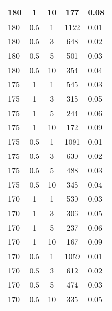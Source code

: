 \begin{longtable} {| p{3cm} | c | c | c | p{2cm} |}
	180 & 1 & 10 &  177    & 0.08          \\ \hline
	180 & 0.5 & 1  &  1122 & 0.01             \\ \hline
	180 & 0.5 & 3  &  648  & 0.02            \\ \hline
	180 & 0.5 & 5  &  501  & 0.03            \\ \hline
	180 & 0.5 & 10 &  354  & 0.04            \\ \hline
	175 & 1 & 1  &  545    & 0.03          \\ \hline
	175 & 1 & 3  &  315    & 0.05          \\ \hline
	175 & 1 & 5  &  244    & 0.06          \\ \hline
	175 & 1 & 10 &  172    & 0.09          \\ \hline
	175 & 0.5 & 1  &  1091 & 0.01             \\ \hline
	175 & 0.5 & 3  &  630  & 0.02            \\ \hline
	175 & 0.5 & 5  &  488  & 0.03            \\ \hline
	175 & 0.5 & 10 &  345  & 0.04            \\ \hline
	170 & 1 & 1  &  530    & 0.03          \\ \hline
	170 & 1 & 3  &  306    & 0.05          \\ \hline
	170 & 1 & 5  &  237    & 0.06          \\ \hline
	170 & 1 & 10 &  167    & 0.09          \\ \hline
	170 & 0.5 & 1  &  1059 & 0.01             \\ \hline
	170 & 0.5 & 3  &  612  & 0.02            \\ \hline
	170 & 0.5 & 5  &  474  & 0.03            \\ \hline
	170 & 0.5 & 10 &  335  & 0.05            \\ \hline
\end{longtable}



